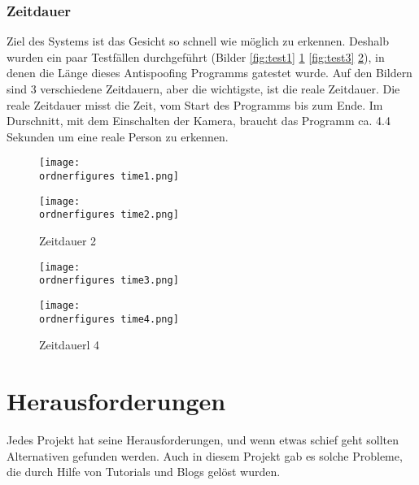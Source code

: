 \subsubsection{Zeitdauer}
Ziel des Systems ist das Gesicht so schnell wie möglich zu erkennen. Deshalb wurden ein paar Testfällen durchgeführt (Bilder \ref{fig:test1} \ref{fig:test2} \ref{fig:test3} \ref{fig:test4}), in denen die Länge dieses Antispoofing Programms gatestet wurde. Auf den Bildern sind 3 verschiedene Zeitdauern, aber die wichtigste, ist die reale Zeitdauer. Die reale Zeitdauer misst die Zeit, vom Start des Programms bis zum Ende. Im Durschnitt, mit dem Einschalten der Kamera, braucht das Programm ca. 4.4 Sekunden um eine reale Person zu erkennen.
\begin{figure}[!htb]
   \begin{minipage}{0.48\textwidth}
     \centering
     \texttt{[image: \\ordnerfigures time1.png]}
     \caption{Zeitdauer 1}
     \label{fig:test1}
   \end{minipage}\hfill
   \begin{minipage}{0.48\textwidth}
     \centering
     \texttt{[image: \\ordnerfigures time2.png]}
     \caption{Zeitdauer 2}
     \label{fig:test2}
   \end{minipage}
\end{figure}
\begin{figure}[!htb]
   \begin{minipage}{0.48\textwidth}
     \centering
     \texttt{[image: \\ordnerfigures time3.png]}
     \caption{Zeitdauer 3}
     \label{fig:test3}
   \end{minipage}\hfill
   \begin{minipage}{0.48\textwidth}
     \centering
     \texttt{[image: \\ordnerfigures time4.png]}
     \caption{Zeitdauerl 4}
     \label{fig:test4}
   \end{minipage}
\end{figure}
\newpage
\section{Herausforderungen}\label{chap:hf}
Jedes Projekt hat seine Herausforderungen, und wenn etwas schief geht sollten Alternativen gefunden werden. Auch in diesem Projekt gab es solche Probleme, die durch Hilfe von Tutorials und Blogs gelöst wurden.
